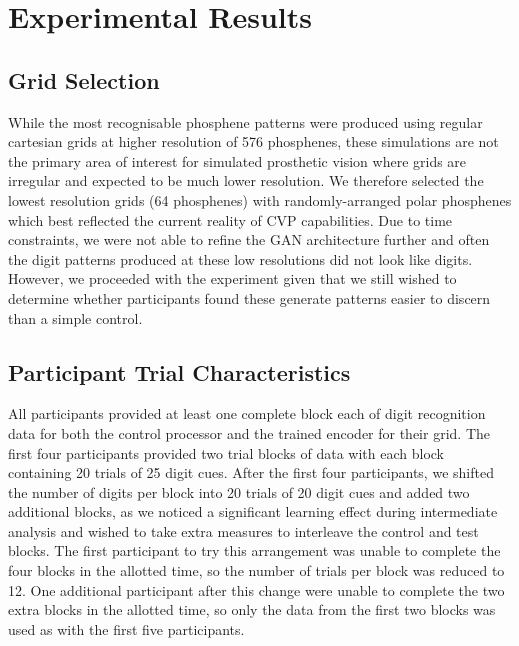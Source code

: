 \documentclass[a4paper,11pt,openany]{book}
\begin{document}
\chapter{Experimental Results}
\label{sec:org79d81d6}
\label{orgf46dd67}

\section*{Grid Selection}
\label{sec:orgc16c626}

While the most recognisable phosphene patterns were produced using regular cartesian grids at higher resolution of 576 phosphenes, these simulations are not the primary area of interest for simulated prosthetic vision where grids are irregular and expected to be much lower resolution.
We therefore selected the lowest resolution grids (64 phosphenes) with randomly-arranged polar phosphenes which best reflected the current reality of CVP capabilities.
Due to time constraints, we were not able to refine the GAN architecture further and often the digit patterns produced at these low resolutions did not look like digits.
However, we proceeded with the experiment given that we still wished to determine whether participants found these generate patterns easier to discern than a simple control.

\section*{Participant Trial Characteristics}
\label{sec:orgce7698f}
\label{orgfc6280b}

All participants provided at least one complete block each of digit recognition data for both the control processor and the trained encoder for their grid.
The first four participants provided two trial blocks of data with each block containing 20 trials of 25 digit cues.
After the first four participants, we shifted the number of digits per block into 20 trials of 20 digit cues and added two additional blocks, as we noticed a significant learning effect during intermediate analysis and wished to take extra measures to interleave the control and test blocks.
The first participant to try this arrangement was unable to complete the four blocks in the allotted time, so the number of trials per block was reduced to 12.
One additional participant after this change were unable to complete the two extra blocks in the allotted time, so only the data from the first two blocks was used as with the first five participants.
\end{document}
